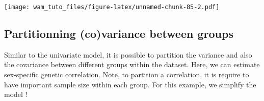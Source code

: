\documentclass[
  12pt,
]{book}
\newenvironment{Shaded}{\begin{snugshade}}{\end{snugshade}}
\newcommand{\DataTypeTok}[1]{\textcolor[rgb]{0.13,0.29,0.53}{#1}}
\newcommand{\DecValTok}[1]{\textcolor[rgb]{0.00,0.00,0.81}{#1}}
\newcommand{\FloatTok}[1]{\textcolor[rgb]{0.00,0.00,0.81}{#1}}
\newcommand{\KeywordTok}[1]{\textcolor[rgb]{0.13,0.29,0.53}{\textbf{#1}}}
\newcommand{\NormalTok}[1]{#1}
\newcommand{\OperatorTok}[1]{\textcolor[rgb]{0.81,0.36,0.00}{\textbf{#1}}}
\newcommand{\StringTok}[1]{\textcolor[rgb]{0.31,0.60,0.02}{#1}}
\begin{document}
\texttt{[image: wam\_tuto\_files/figure-latex/unnamed-chunk-85-2.pdf]}

\hypertarget{partitionning-covariance-between-groups}{%
\subsection{Partitionning (co)variance between groups}\label{partitionning-covariance-between-groups}}

Similar to the univariate model, it is possible to partition the variance and also the covariance between different groups within the dataset. Here, we can estimate sex-specific genetic correlation.
Note, to partition a correlation, it is require to have important sample size within each group. For this example, we simplify the model !

\begin{Shaded}
\end{Shaded}
\end{document}
